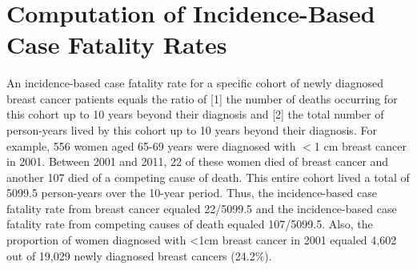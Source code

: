 \documentclass[11pt,letterpaper]{article}
\theoremstyle{plain}
\theoremstyle{remark}
\numberwithin{equation}{section}
\begin{document}
\blind \title{\bf \tit} \maketitle \fi


\thispagestyle{empty}
\setcounter{page}{0}



\newpage
\clearpage
 \setcounter{table}{0}  %
 \setcounter{figure}{0}  %
 \setcounter{page}{1}
 \renewcommand{\figurename}{Supplemental Figure}
 \renewcommand{\tablename}{Supplemental Table}
\appendix

\section{Computation of Incidence-Based Case Fatality Rates}
An incidence-based case fatality rate for a specific cohort of newly
diagnosed breast cancer patients equals the ratio of [1] the number of
deaths occurring for this cohort up to 10 years beyond their diagnosis
and [2] the total number of person-years lived by this cohort up to 10
years beyond their diagnosis.  For example, 556 women aged 65-69 years
were diagnosed with $<$1 cm breast cancer in 2001.  Between 2001 and
2011, 22 of these women died of breast cancer and another 107 died of
a competing cause of death.  This entire cohort lived a total of
5099.5 person-years over the 10-year period.  Thus, the
incidence-based case fatality rate from breast cancer equaled
22/5099.5 and the incidence-based case fatality rate from competing
causes of death equaled 107/5099.5.  Also, the proportion of women
diagnosed with <1cm breast cancer in 2001 equaled 4,602 out of 19,029
newly diagnosed breast cancers (24.2\%).
\end{document}
